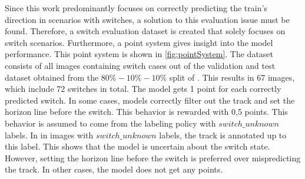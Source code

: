 \noindent Since this work predominantly focuses on correctly predicting the train's direction in scenarios with switches, a solution to this evaluation issue must be found.
Therefore, a switch evaluation dataset is created that solely focuses on switch scenarios.
Furthermore, a point system gives insight into the model performance.
This point system is shown in \autoref{fig:pointSystem}.
The dataset consists of all images containing switch cases out of the validation and test dataset obtained from the $80\%-10\%-10\%$ split of \cite{tepNet2024}.
This results in 67 images, which include 72 switches in total.
The model gets 1 point for each correctly predicted switch.
In some cases, models correctly filter out the track and set the horizon line before the switch.
This behavior is rewarded with 0,5 points.
This behavior is assumed to come from the labeling policy with $switch\_unknown$ labels.
In \cite{tepNet2024} in images with $switch\_unknown$ labels, the track is annotated up to this label.
This shows that the model is uncertain about the switch state.
However, setting the horizon line before the switch is preferred over mispredicting the track.
In other cases, the model does not get any points.

